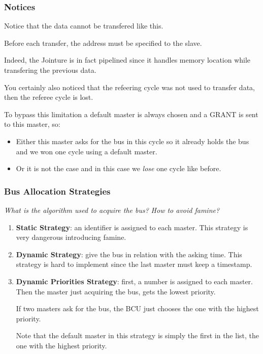 \begin{frame}
  \frametitle{Notices}

  Notice that the data cannot be transfered like this.

  \-

  Before each transfer, the address must be specified to the slave.

  \-

  Indeed, the Jointure is in fact pipelined since it handles memory location
  while transfering the previous data.

  \-

  You certainly also noticed that the refeering cycle was not used to
  transfer data, then the referee cycle is lost.

  \-

  To bypass this limitation a default master is always chosen and a GRANT
  is sent to this master, so:

  \begin{itemize}
    \item
      Either this master asks for the bus in this cycle so it already
      holds the bus and we won one cycle using a default master.
    \item
      Or it is not the case and in this case we \textit{lose} one
      cycle like before.
  \end{itemize}
\end{frame}


\begin{frame}
  \frametitle{Bus Allocation Strategies}

  \textit{What is the algorithm used to acquire the bus?}
  \textit{How to avoid famine?}

  \begin{enumerate}
    \item
      \textbf{Static Strategy}: an identifier is assigned to each master.
      This strategy is very dangerous introducing famine.
    \item
      \textbf{Dynamic Strategy}: give the bus in relation with the asking
      time. This strategy is hard to implement since the last master must
      keep a timestamp.
    \item
      \textbf{Dynamic Priorities Strategy}: first, a number is assigned
      to each master. Then the master just acquiring the bus, gets the
      lowest priority.

      \-

      If two masters ask for the bus, the BCU just chooses the one with
      the highest priority.

      \-

      Note that the default master in this strategy is simply the first
      in the list, the one with the highest priority.
  \end{enumerate}
\end{frame}

